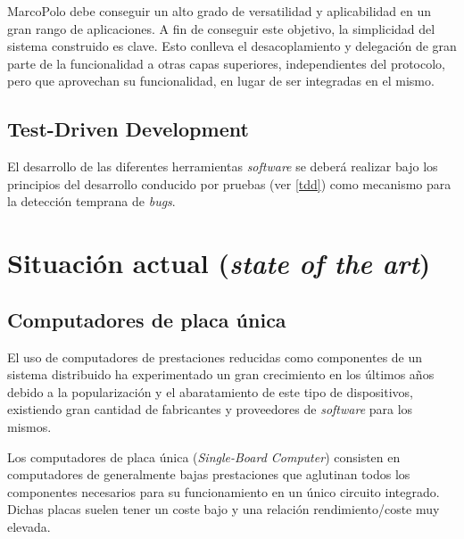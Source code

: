 MarcoPolo debe conseguir un alto grado de versatilidad y aplicabilidad en un gran rango de aplicaciones. A fin de conseguir este objetivo, la simplicidad del sistema construido es clave. Esto conlleva el desacoplamiento y delegación de gran parte de la funcionalidad a otras capas superiores, independientes del protocolo, pero que aprovechan su funcionalidad, en lugar de ser integradas en el mismo.

\subsection{Test-Driven Development}

El desarrollo de las diferentes herramientas \textit{software} se deberá realizar bajo los principios del desarrollo conducido por pruebas (ver \ref{tdd}) como mecanismo para la detección temprana de \textit{bugs}.

\section{Situación actual (\textit{state of the art})}



\subsection{Computadores de placa única}

El uso de computadores de prestaciones reducidas como componentes de un sistema distribuido ha experimentado un gran crecimiento en los últimos años debido a la popularización y el abaratamiento de este tipo de dispositivos, existiendo gran cantidad de fabricantes y proveedores de \textit{software} para los mismos.

Los computadores de placa única (\textit{Single-Board Computer}) consisten en computadores de generalmente bajas prestaciones que aglutinan todos los componentes necesarios para su funcionamiento en un único circuito integrado. Dichas placas suelen tener un coste bajo y una relación rendimiento/coste muy elevada.


